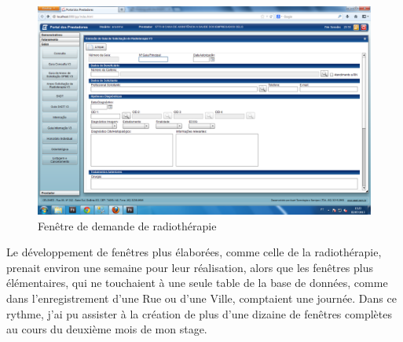 \begin{figure}[h]
\begin{center}
    \includegraphics[scale=0.39]{img/pp-radio}
    \caption{Fenêtre de demande de radiothérapie}
	\label{pp-radio}
\end{center}
\end{figure}

Le développement de fenêtres plus élaborées, comme celle de la radiothérapie, prenait environ une semaine pour leur réalisation, alors que les fenêtres plus élémentaires, qui ne touchaient à une seule table de la base de données, comme dans l'enregistrement d'une Rue ou d'une Ville, comptaient une journée. Dans ce rythme, j'ai pu assister à la création de plus d'une dizaine de fenêtres complètes au cours du deuxième mois de mon stage.